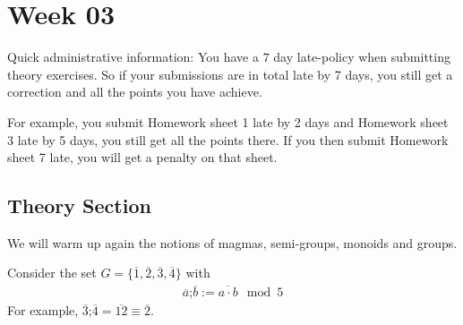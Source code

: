 \section{Week 03}
Quick administrative information:
You have a $7$ day late-policy when submitting theory exercises. So if your submissions are in total late by 7 days, you still get a correction and all the points you have achieve.

For example, you submit Homework sheet 1 late by 2 days and Homework sheet 3 late by 5 days, you still get all the points there. If you then submit Homework sheet 7 late, you will get a penalty on that sheet.


\subsection{Theory Section}
We will warm up again the notions of magmas, semi-groups, monoids and groups.

Consider the set $G = \{\overline{1},\overline{2},\overline{3},\overline{4}\}$ with
\begin{align*}
  \overline{a}\texttt{;} \overline{b} := \overline{a \cdot b} \mod 5
\end{align*}
For example, $\overline{3} \texttt{;} \overline{4} = \overline{12} \equiv \overline{2}$.

